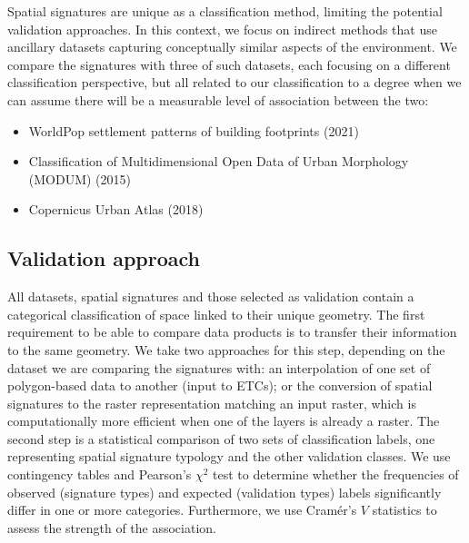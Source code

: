 Spatial signatures are unique as a classification method, limiting the potential
validation approaches. In this context, we focus on indirect methods that use ancillary datasets capturing
conceptually similar aspects of the environment. We compare the signatures with three of
such datasets, each focusing on a different classification perspective, but all related
to our classification to a degree when we can assume there will be a measurable level of
association between the two:

\begin{itemize}
    \item WorldPop settlement patterns of building footprints (2021)\cite{jochem2021tools}
    \item Classification of Multidimensional Open Data of Urban Morphology (MODUM) (2015)\cite{alexiou2016}
    \item Copernicus Urban Atlas (2018)\cite{eea2018}
\end{itemize}


\subsection*{Validation approach}
All datasets, spatial signatures and those selected as validation contain a
categorical classification of space linked to their unique geometry. The first
requirement to be able to compare data products is to transfer their
information to the same geometry. We take two approaches for this step,
depending on the dataset we are comparing the signatures with:
an interpolation of one set of polygon-based data to another (input to ETCs);
or the conversion of
spatial signatures to the raster representation matching an input raster,
which is computationally more efficient when one of the layers is already a raster. The second
step is a statistical comparison of two sets of classification labels, one representing
spatial signature typology and the other validation classes. We use contingency tables
and Pearson's $\chi^{2}$ test to determine whether the frequencies of observed
(signature types) and expected (validation types) labels significantly differ in one or
more categories. Furthermore, we use Cramér's $V$ statistics\cite{cramer2016mathematical} to assess the strength of
the association.

